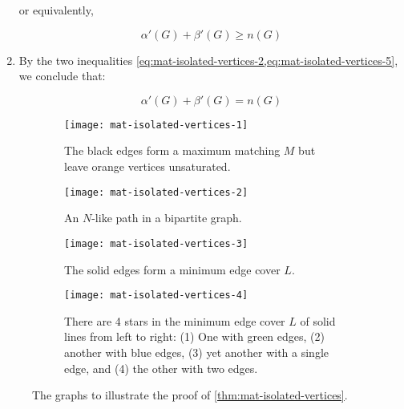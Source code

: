 \documentclass[../src/handouts/main.tex]{subfiles}
\begin{document}
\begin{enumerate}
    or equivalently,

    \begin{equation}
      \alpha'(G) + \beta'(G) \geq n(G)
      \label{eq:mat-isolated-vertices-5}
    \end{equation}

  \item By the two inequalities \cref{eq:mat-isolated-vertices-2,eq:mat-isolated-vertices-5}, we conclude that:

    \begin{equation}
      \alpha'(G) + \beta'(G) = n(G)
      \label{eq:mat-isolated-vertices-56}
    \end{equation}

\end{enumerate}

\begin{figure}[htbp]
  \centering
  \begin{subfigure}[t]{.45\textwidth}
    \centering
    \texttt{[image: mat-isolated-vertices-1]}
    \caption{The black edges form a maximum matching $M$ but leave orange vertices unsaturated.}
    \label{fig:mat-isolated-vertices-1}
  \end{subfigure}
  \hfill
  \begin{subfigure}[t]{.45\textwidth}
    \centering
    \texttt{[image: mat-isolated-vertices-2]}
    \caption{An $N$-like path in a bipartite graph.}
    \label{fig:mat-isolated-vertices-2}
  \end{subfigure}

  \begin{subfigure}[t]{.45\textwidth}
    \centering
    \texttt{[image: mat-isolated-vertices-3]}
    \caption{The solid edges form a minimum edge cover $L$.}
    \label{fig:mat-isolated-vertices-3}
  \end{subfigure}
  \hfill
  \begin{subfigure}[t]{.45\textwidth}
    \centering
    \texttt{[image: mat-isolated-vertices-4]}
    \caption{There are 4 stars in the minimum edge cover $L$ of solid lines from left to right: (1) One with green edges, (2) another with blue edges, (3) yet another with a single edge, and (4) the other with two edges.}
    \label{fig:mat-isolated-vertices-4}
  \end{subfigure}

  \caption{The graphs to illustrate the proof of \cref{thm:mat-isolated-vertices}.}
  \label{fig:mat-isolated-vertices}
\end{figure}
\end{document}
